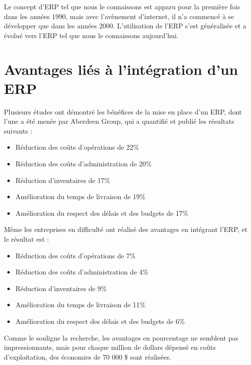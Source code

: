 Le concept d'\acs{ERP} tel que nous le connaissons est apparu pour la première fois dans les années 1990, mais avec l'avènement d'internet, il n'a commencé à se développer que dans les années 2000. L'utilisation de l'\acs{ERP} s'est généralisée et a évolué vers l'\acs{ERP} tel que nous le connaissons aujourd'hui.

\section{Avantages liés à l’intégration d’un \acs{ERP}}
Plusieurs études ont démontré les bénéfices de la mise en place d'un \acs{ERP}, dont l'une a été menée par Aberdeen Group,\cite{avantages} qui a quantifié et publié les résultats suivants :\\

\begin{itemize}
    \item Réduction des coûts d’opérations de 22\%
    \item Réduction des coûts d’administration de 20\%
    \item Réduction d’inventaires de 17\%
    \item Amélioration du temps de livraison de 19\%
    \item Amélioration du respect des délais et des budgets de 17\%\\
\end{itemize}

Même les entreprises en difficulté ont réalisé des avantages en intégrant l'\acs{ERP}, et le résultat est :\\

\begin{itemize}
    \item Réduction des coûts d’opérations de 7\%
    \item Réduction des coûts d’administration de 4\%
    \item Réduction d’inventaires de 9\%
    \item Amélioration du temps de livraison de 11\%
    \item Amélioration du respect des délais et des budgets de 6\%\\
\end{itemize}

Comme le souligne la recherche, les avantages en pourcentage ne semblent pas impressionnants, mais pour chaque million de dollars dépensé en coûts d'exploitation, des économies de 70 000 \$ sont réalisées.\\

